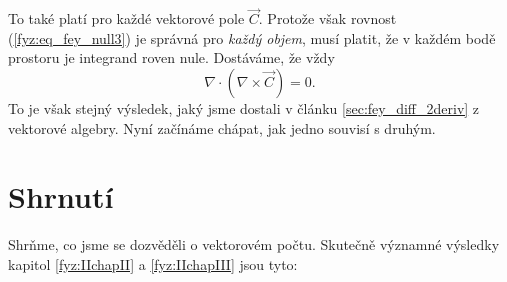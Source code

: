     To také platí pro každé vektorové pole \(\vec{C}\). Protože však rovnost 
    (\ref{fyz:eq_fey_null3}) je správná pro \emph{každý objem}, musí platit, že v každém bodě 
    prostoru je integrand roven nule. Dostáváme, že vždy
    \begin{equation}\label{fyz:eq_fey_null4}
     \nabla\cdot(\nabla\times\vec{C})=0.
    \end{equation}
    To je však stejný výsledek, jaký jsme dostali v článku \ref{sec:fey_diff_2deriv} z vektorové 
    algebry. Nyní začínáme chápat, jak jedno souvisí s druhým.      
 
  \section{Shrnutí}
    Shrňme, co jsme se dozvěděli o vektorovém počtu. Skutečně významné výsledky kapitol
    \ref{fyz:IIchapII} a \ref{fyz:IIchapIII} jsou tyto:
